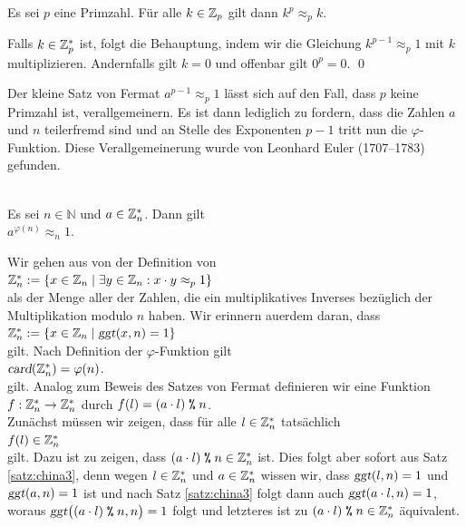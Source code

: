 \begin{Korollar}
  Es sei $p$ eine Primzahl.  F\"{u}r alle $k \in \mathbb{Z}_{p}$ gilt dann $k^p \approx_p k$.
\end{Korollar}

\proof
Falls $k \in \mathbb{Z}_{p}^*$ ist, folgt die Behauptung, indem wir die Gleichung $k^{p-1} \approx_p 1$
mit $k$ multiplizieren.  Andernfalls gilt $k= 0$ und offenbar gilt $0^p = 0$. \qed
\vspace*{0.3cm}

Der kleine Satz von Fermat $a^{p-1} \approx_p 1$ l\"{a}sst sich auf den Fall, dass $p$ keine Primzahl ist,
verallgemeinern.  Es ist dann lediglich zu fordern, dass die Zahlen $a$ und $n$ teilerfremd sind und an
Stelle des Exponenten $p - 1$ tritt nun die $\varphi$-Funktion.   Diese Verallgemeinerung wurde von Leonhard
Euler (1707--1783) gefunden.


\begin{Satz} \hspace*{\fill} \\ 
Es sei $n \in \mathbb{N}$ und  $a \in \mathbb{Z}_{n}^*$. Dann gilt
\\[0.2cm]
\hspace*{1.3cm}
$a^{\varphi(n)} \approx_n 1$.  
\end{Satz}

\proof
Wir gehen aus von der Definition von
\\[0.2cm]
\hspace*{1.3cm}
$\mathbb{Z}_{n}^* := \{ x \in \mathbb{Z}_{n} \mid \exists y \in \mathbb{Z}_{n} : x \cdot y \approx_p 1 \}$
\\[0.2cm]
als der Menge aller der Zahlen, die ein multiplikatives Inverses bez\"{u}glich der Multiplikation modulo $n$
haben.  Wir erinnern au\3erdem daran, dass
\\[0.2cm]
\hspace*{1.3cm}
$\mathbb{Z}_{n}^* := \{ x \in \mathbb{Z}_{n} \mid \textsl{ggt}(x, n) = 1 \}$
\\[0.2cm]
gilt.  Nach Definition der $\varphi$-Funktion gilt
\\[0.2cm]
\hspace*{1.3cm}
$\textsl{card}(\mathbb{Z}_{n}^*) = \varphi(n)$.
\\[0.2cm]
gilt.  Analog zum Beweis des Satzes von Fermat definieren wir eine Funktion
\\[0.2cm]
\hspace*{1.3cm}
$f: \mathbb{Z}_{n}^* \rightarrow \mathbb{Z}_{n}^*$ \quad durch \quad $f(l) = (a \cdot l) \;\texttt{\%}\; n$.
\\[0.2cm]
Zun\"{a}chst m\"{u}ssen wir zeigen, dass f\"{u}r alle $l \in \mathbb{Z}_{n}^*$ tats\"{a}chlich 
\\[0.2cm]
\hspace*{1.3cm}
$f(l) \in \mathbb{Z}_{n}^*$
\\[0.2cm]
gilt.  Dazu ist zu zeigen, dass $(a \cdot l) \;\texttt{\%}\; n \in \mathbb{Z}_{n}^*$ ist.  
Dies folgt aber sofort aus Satz \ref{satz:china3}, denn
wegen $l \in \mathbb{Z}_{n}^*$ und $a \in \mathbb{Z}_{n}^*$ wissen wir, dass $\textsl{ggt}(l,n) = 1$ und
$\textsl{ggt}(a,n) = 1$ ist und nach Satz \ref{satz:china3} folgt dann auch 
$\textsl{ggt}(a \cdot l, n) = 1$, woraus $\textsl{ggt}\bigl((a \cdot l) \;\texttt{\%}\; n, n\bigr) = 1$
folgt und letzteres ist zu $(a \cdot l) \;\texttt{\%}\; n \in \mathbb{Z}_{n}^*$ \"{a}quivalent.



